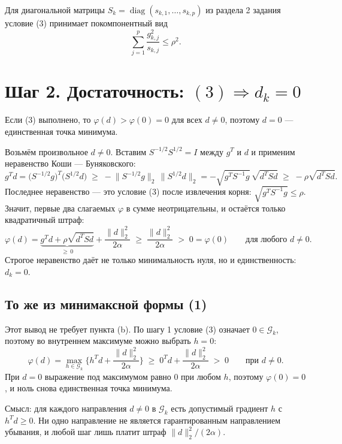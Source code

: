 \documentclass[11pt,a4paper]{article}
\newcommand{\G}{\mathcal{G}_k}
\newcommand{\Shalf}{S^{1/2}}
\newcommand{\Smhalf}{S^{-1/2}}
\newcommand{\norm}[1]{\lVert #1\rVert_2}
\DeclareMathOperator{\diag}{diag}
\begin{document}
Для диагональной матрицы $S_k = \diag(s_{k,1},\dots,s_{k,p})$ из раздела 2 задания
условие (3) принимает покомпонентный вид
\begin{equation*}
\sum_{j=1}^{p} \frac{g_{k,j}^2}{s_{k,j}} \le \rho^2 .
\end{equation*}

\section*{Шаг 2. Достаточность: $(3) \Rightarrow d_k = 0$}

Если (3) выполнено, то $\varphi(d) > \varphi(0) = 0$ для всех $d \ne 0$, поэтому
$d = 0$ — единственная точка минимума.

Возьмём произвольное $d \neq 0$. Вставим $\Smhalf\Shalf = I$ между $g^T$ и $d$ и
применим неравенство Коши — Буняковского:
\begin{equation*}
g^Td = \big(\Smhalf g\big)^T\big(\Shalf d\big)
\;\ge\; -\norm{\Smhalf g}\,\norm{\Shalf d}
= -\sqrt{g^TS^{-1}g}\,\sqrt{d^TSd} \;\ge\; -\rho\sqrt{d^TSd}.
\end{equation*}
Последнее неравенство — это условие (3) после извлечения корня:
$\sqrt{g^TS^{-1}g} \le \rho$. Значит, первые два слагаемых $\varphi$ в сумме
неотрицательны, и остаётся только квадратичный штраф:
\begin{equation*}
\varphi(d) = \underbrace{g^Td + \rho\sqrt{d^TSd}}_{\ge\, 0} + \frac{\norm{d}^2}{2\alpha}
\;\ge\; \frac{\norm{d}^2}{2\alpha} \;>\; 0 = \varphi(0)
\qquad \text{для любого } d \ne 0 .
\end{equation*}
Строгое неравенство даёт не только минимальность нуля, но и единственность:
$d_k = 0$.

\subsection*{То же из минимаксной формы (1)}

Этот вывод не требует пункта (b). По шагу 1 условие (3) означает $0 \in \G$,
поэтому во внутреннем максимуме можно выбрать $h = 0$:
\begin{equation*}
\varphi(d) = \max_{h\in\G}\Big\{h^Td + \frac{\norm{d}^2}{2\alpha}\Big\}
\;\ge\; 0^Td + \frac{\norm{d}^2}{2\alpha} \;>\; 0 \qquad \text{при } d\ne 0 .
\end{equation*}
При $d = 0$ выражение под максимумом равно $0$ при любом $h$, поэтому
$\varphi(0) = 0$, и ноль снова единственная точка минимума.

Смысл: для каждого направления $d \ne 0$ в $\G$ есть допустимый градиент $h$ с
$h^Td \ge 0$. Ни одно направление не является гарантированным направлением
убывания, и любой шаг лишь платит штраф $\norm{d}^2/(2\alpha)$.
\end{document}

